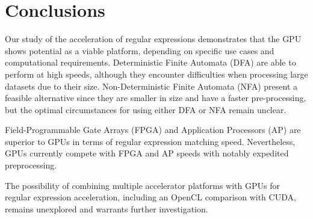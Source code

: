 \documentclass[10pt,onecolumn,twoside,english,a4paper]{article}
\begin{document}
\section{Conclusions} \label{Conclusions}
Our study of the acceleration of regular expressions demonstrates that the GPU shows potential as a viable platform, depending on specific use cases and computational requirements. Deterministic Finite Automata (DFA) are able to perform at high speeds, although they encounter difficulties when processing large datasets due to their size. Non-Deterministic Finite Automata (NFA) present a feasible alternative since they are smaller in size and have a faster pre-processing, but the optimal circumstances for using either DFA or NFA remain unclear.

Field-Programmable Gate Arrays (FPGA) and Application Processors (AP) are superior to GPUs in terms of regular expression matching speed. Nevertheless, GPUs currently compete with FPGA and AP speeds with notably expedited preprocessing.

The possibility of combining multiple accelerator platforms with GPUs for regular expression acceleration, including an OpenCL comparison with CUDA, remains unexplored and warrants further investigation.



\end{document}
